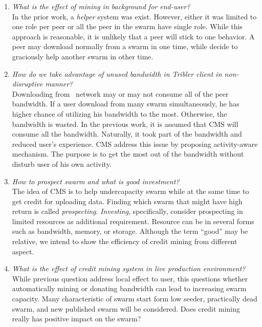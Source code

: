 \begin{enumerate}
	\item \textit{What is the effect of mining in background for end-user?}
		\\ In the prior work, a \textit{helper} system was exist. However, either it was limited to one role per peer or all the peer in the swarm have single role. While this approach is reasonable, it is unlikely that a peer will stick to one behavior. A peer may download normally from a swarm in one time, while decide to graciously help another swarm in other time.
		
	\item \textit{How do we take advantage of unused bandwidth in Tribler client in non-disruptive manner?}
		\\ Downloading from \bt~network may or may not consume all of the peer bandwidth. If a user download from many swarm simultaneously, he has higher chance of utilizing his bandwidth to the most. Otherwise, the bandwidth is wasted. In the previous work, it is assumed that CMS will consume all the bandwidth. Naturally, it took part of the bandwidth and reduced user's experience. CMS address this issue by proposing activity-aware mechanism. The purpose is to get the most out of the bandwidth without disturb user of his own activity.
		
	\item \textit{How to prospect swarm and what is good investment?}
		\\ The idea of CMS is to help undercapacity swarm while at the same time to get credit for uploading data. Finding which swarm that might have high return is called \textit{prospecting}. \textit{Investing}, specifically, consider prospecting in limited resources as additional requirement. Resource can be in several forms such as bandwidth, memory, or storage. Although the term ``good'' may be relative, we intend to show the efficiency of credit mining from different aspect.
		
	\item \textit{What is the effect of credit mining system in live production environment?}
		\\ While previous question address local effect to user, this questions whether automatically mining or donating bandwidth can lead to increasing swarm capacity. Many characteristic of swarm start form low seeder, practically dead swarm, and new published swarm will be considered. Does credit mining really has positive impact on the swarm?
		

\end{enumerate}
